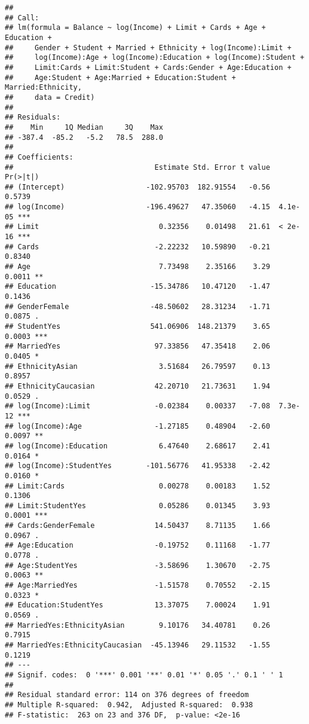 \documentclass[
]{article}
\begin{document}
\begin{verbatim}
## 
## Call:
## lm(formula = Balance ~ log(Income) + Limit + Cards + Age + Education + 
##     Gender + Student + Married + Ethnicity + log(Income):Limit + 
##     log(Income):Age + log(Income):Education + log(Income):Student + 
##     Limit:Cards + Limit:Student + Cards:Gender + Age:Education + 
##     Age:Student + Age:Married + Education:Student + Married:Ethnicity, 
##     data = Credit)
## 
## Residuals:
##    Min     1Q Median     3Q    Max 
## -387.4  -85.2   -5.2   78.5  288.0 
## 
## Coefficients:
##                                 Estimate Std. Error t value Pr(>|t|)    
## (Intercept)                   -102.95703  182.91554   -0.56   0.5739    
## log(Income)                   -196.49627   47.35060   -4.15  4.1e-05 ***
## Limit                            0.32356    0.01498   21.61  < 2e-16 ***
## Cards                           -2.22232   10.59890   -0.21   0.8340    
## Age                              7.73498    2.35166    3.29   0.0011 ** 
## Education                      -15.34786   10.47120   -1.47   0.1436    
## GenderFemale                   -48.50602   28.31234   -1.71   0.0875 .  
## StudentYes                     541.06906  148.21379    3.65   0.0003 ***
## MarriedYes                      97.33856   47.35418    2.06   0.0405 *  
## EthnicityAsian                   3.51684   26.79597    0.13   0.8957    
## EthnicityCaucasian              42.20710   21.73631    1.94   0.0529 .  
## log(Income):Limit               -0.02384    0.00337   -7.08  7.3e-12 ***
## log(Income):Age                 -1.27185    0.48904   -2.60   0.0097 ** 
## log(Income):Education            6.47640    2.68617    2.41   0.0164 *  
## log(Income):StudentYes        -101.56776   41.95338   -2.42   0.0160 *  
## Limit:Cards                      0.00278    0.00183    1.52   0.1306    
## Limit:StudentYes                 0.05286    0.01345    3.93   0.0001 ***
## Cards:GenderFemale              14.50437    8.71135    1.66   0.0967 .  
## Age:Education                   -0.19752    0.11168   -1.77   0.0778 .  
## Age:StudentYes                  -3.58696    1.30670   -2.75   0.0063 ** 
## Age:MarriedYes                  -1.51578    0.70552   -2.15   0.0323 *  
## Education:StudentYes            13.37075    7.00024    1.91   0.0569 .  
## MarriedYes:EthnicityAsian        9.10176   34.40781    0.26   0.7915    
## MarriedYes:EthnicityCaucasian  -45.13946   29.11532   -1.55   0.1219    
## ---
## Signif. codes:  0 '***' 0.001 '**' 0.01 '*' 0.05 '.' 0.1 ' ' 1
## 
## Residual standard error: 114 on 376 degrees of freedom
## Multiple R-squared:  0.942,  Adjusted R-squared:  0.938 
## F-statistic:  263 on 23 and 376 DF,  p-value: <2e-16
\end{verbatim}
\end{document}
